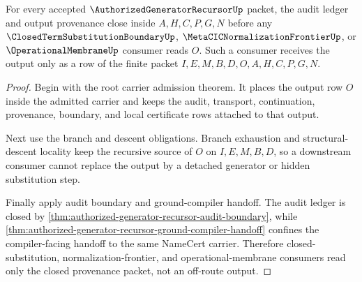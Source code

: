 \begin{theorem}
\label{thm:authorized-generator-recursor-ledger-provenance-closure}
For every accepted $\AuthorizedGeneratorRecursorUp$ packet, the audit ledger and output provenance close inside $A,H,C,P,G,N$ before any $\ClosedTermSubstitutionBoundaryUp$, $\MetaCICNormalizationFrontierUp$, or $\OperationalMembraneUp$ consumer reads $O$. Such a consumer receives the output only as a row of the finite packet $I,E,M,B,D,O,A,H,C,P,G,N$.
\end{theorem}
\begin{proof}
Begin with the root carrier admission theorem. It places the output row $O$ inside the admitted carrier and keeps the audit, transport, continuation, provenance, boundary, and local certificate rows attached to that output.

Next use the branch and descent obligations. Branch exhaustion and structural-descent locality keep the recursive source of $O$ on $I,E,M,B,D$, so a downstream consumer cannot replace the output by a detached generator or hidden substitution step.

Finally apply audit boundary and ground-compiler handoff. The audit ledger is closed by \autoref{thm:authorized-generator-recursor-audit-boundary}, while \autoref{thm:authorized-generator-recursor-ground-compiler-handoff} confines the compiler-facing handoff to the same NameCert carrier. Therefore closed-substitution, normalization-frontier, and operational-membrane consumers read only the closed provenance packet, not an off-route output.
\end{proof}

